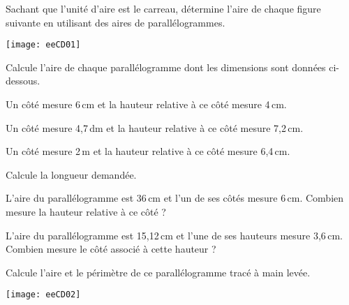 


\begin{exercice}
Sachant que l'unité d'aire est le carreau, détermine l'aire de chaque figure suivante en utilisant des aires de parallélogrammes.
\begin{center}
    \texttt{[image: eeCD01]}
\end{center}
\end{exercice}



\begin{exercice}[]
Calcule l'aire de chaque parallélogramme dont les dimensions sont données ci-dessous.
\begin{colenumerate}{1} 
\item Un côté mesure 6\,cm et la hauteur relative à ce côté mesure 4\,cm.
\item Un côté mesure 4,7\,dm et la hauteur relative à ce côté mesure 7,2\,cm.
\item Un côté mesure 2\,m et la hauteur relative à ce côté mesure 6,4\,cm.
\end{colenumerate} 
\end{exercice}

\begin{exercice}[]
Calcule la longueur demandée.
\begin{colenumerate}{1} 
\item L'aire du parallélogramme est 36\,cm et l'un de ses côtés mesure 6\,cm. Combien mesure la hauteur relative à ce côté ?
\item L'aire du parallélogramme est 15,12\,cm et l'une de ses hauteurs mesure 3,6\,cm. Combien mesure le côté associé à cette hauteur ?
\end{colenumerate} 
 
\end{exercice}

\begin{exercice}
Calcule l'aire et le périmètre de ce parallélogramme tracé à main levée.
\begin{center}
    \texttt{[image: eeCD02]}
\end{center}

\end{exercice}

